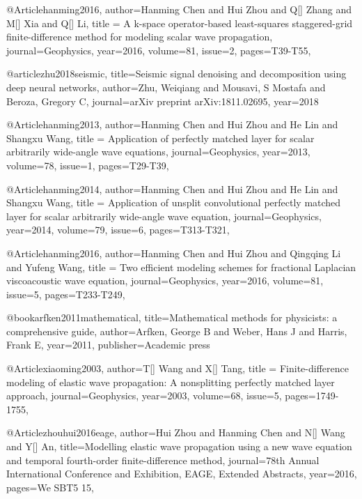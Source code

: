 @Article{hanming2016,
  author={Hanming Chen and Hui Zhou and Q[] Zhang and M[] Xia and Q[] Li},
  title = {A k-space operator-based least-squares staggered-grid finite-difference method for modeling scalar wave propagation},
  journal={Geophysics},
  year=2016,
  volume=81,
  issue=2,
  pages={T39-T55},
}

@article{zhu2018seismic,
  title={Seismic signal denoising and decomposition using deep neural networks},
  author={Zhu, Weiqiang and Mousavi, S Mostafa and Beroza, Gregory C},
  journal={arXiv preprint arXiv:1811.02695},
  year={2018}
}



@Article{hanming2013,
  author={Hanming Chen and Hui Zhou and He Lin and Shangxu Wang},
  title = {Application of perfectly matched layer for scalar arbitrarily wide-angle wave equations},
  journal={Geophysics},
  year=2013,
  volume=78,
  issue=1,
  pages={T29-T39},
}

@Article{hanming2014,
  author={Hanming Chen and Hui Zhou and He Lin and Shangxu Wang},
  title = {Application of unsplit convolutional perfectly matched layer for scalar arbitrarily wide-angle wave equation},
  journal={Geophysics},
  year=2014,
  volume=79,
  issue=6,
  pages={T313-T321},
}

@Article{hanming2016,
  author={Hanming Chen and Hui Zhou and Qingqing Li and Yufeng Wang},
  title = {Two efficient modeling schemes for fractional Laplacian viscoacoustic wave equation},
  journal={Geophysics},
  year=2016,
  volume=81,
  issue=5,
  pages={T233-T249},
}

@book{arfken2011mathematical,
  title={Mathematical methods for physicists: a comprehensive guide},
  author={Arfken, George B and Weber, Hans J and Harris, Frank E},
  year={2011},
  publisher={Academic press}
}

@Article{xiaoming2003,
  author={T[] Wang and X[] Tang},
  title = {Finite-difference modeling of elastic wave propagation: A nonsplitting perfectly matched layer approach},
  journal={Geophysics},
  year=2003,
  volume=68,
  issue=5,
  pages={1749-1755},
}

	




@Article{zhouhui2016eage,
  author={Hui Zhou and Hanming Chen and N[] Wang and Y[] An},
  title={Modelling elastic wave propagation using a new wave equation and temporal fourth-order finite-difference  method},
  journal={78th Annual International Conference and Exhibition, EAGE, Extended Abstracts},
  year=2016,
  pages={We SBT5 15},
}



